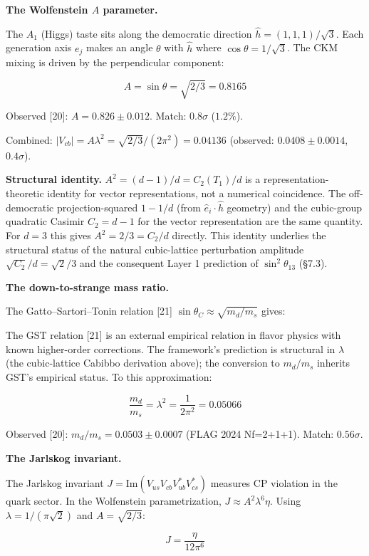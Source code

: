 \documentclass[
]{article}
\begin{document}
\textbf{The Wolfenstein \(A\) parameter.}

The \(A_1\) (Higgs) taste sits along the democratic direction
\(\hat{h} = (1,1,1)/\sqrt{3}\). Each generation axis \(e_j\) makes an
angle \(\theta\) with \(\hat{h}\) where \(\cos\theta = 1/\sqrt{3}\). The
CKM mixing is driven by the perpendicular component:

\[\boxed{A = \sin\theta = \sqrt{2/3} = 0.8165}\]

Observed {[}20{]}: \(A = 0.826 \pm 0.012\). Match: \(0.8\sigma\)
(\(1.2\%\)).

Combined: \(|V_{cb}| = A\lambda^2 = \sqrt{2/3}/(2\pi^2) = 0.04136\)
(observed: \(0.0408 \pm 0.0014\), \(0.4\sigma\)).

\textbf{Structural identity.} \(A^2 = (d-1)/d = C_2(T_1)/d\) is a
representation-theoretic identity for vector representations, not a
numerical coincidence. The off-democratic projection-squared \(1 - 1/d\)
(from \(\hat e_i \cdot \hat h\) geometry) and the cubic-group quadratic
Casimir \(C_2 = d-1\) for the vector representation are the same
quantity. For \(d=3\) this gives \(A^2 = 2/3 = C_2/d\) directly. This
identity underlies the structural status of the natural cubic-lattice
perturbation amplitude \(\sqrt{C_2}/d = \sqrt 2/3\) and the consequent
Layer 1 prediction of \(\sin^2\theta_{13}\) (§7.3).

\textbf{The down-to-strange mass ratio.}

The Gatto--Sartori--Tonin relation {[}21{]}
\(\sin\theta_C \approx \sqrt{m_d/m_s}\) gives:

The GST relation {[}21{]} is an external empirical relation in flavor
physics with known higher-order corrections. The framework's prediction
is structural in \(\lambda\) (the cubic-lattice Cabibbo derivation
above); the conversion to \(m_d/m_s\) inherits GST's empirical status.
To this approximation:

\[\boxed{\frac{m_d}{m_s} = \lambda^2 = \frac{1}{2\pi^2} = 0.05066}\]

Observed {[}20{]}: \(m_d/m_s = 0.0503 \pm 0.0007\) (FLAG 2024 Nf=2+1+1).
Match: \(0.56\sigma\).

\textbf{The Jarlskog invariant.}

The Jarlskog invariant \(J = \text{Im}(V_{us}V_{cb}V^*_{ub}V^*_{cs})\)
measures CP violation in the quark sector. In the Wolfenstein
parametrization, \(J \approx A^2\lambda^6\eta\). Using
\(\lambda = 1/(\pi\sqrt{2})\) and \(A = \sqrt{2/3}\):

\[J = \frac{\eta}{12\pi^6}\]
\end{document}
